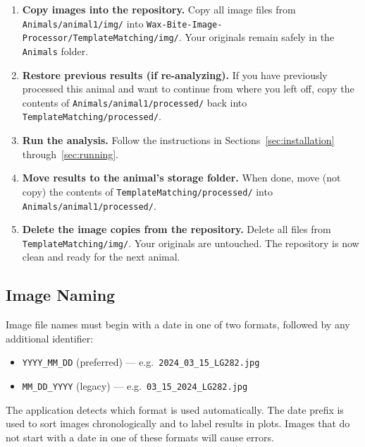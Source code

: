 \documentclass[11pt, letterpaper]{article}
\begin{document}
\begin{enumerate}[leftmargin=*, label=\textbf{\arabic*.}]
  \item \textbf{Copy images into the repository.}
    Copy all image files from \texttt{Animals/animal1/img/} into
    \texttt{Wax-Bite-Image-Processor/TemplateMatching/img/}.
    Your originals remain safely in the \texttt{Animals} folder.

  \item \textbf{Restore previous results (if re-analyzing).}
    If you have previously processed this animal and want to continue from where you left
    off, copy the contents of \texttt{Animals/animal1/processed/} back into
    \texttt{TemplateMatching/processed/}.

  \item \textbf{Run the analysis.}
    Follow the instructions in Sections~\ref{sec:installation} through~\ref{sec:running}.

  \item \textbf{Move results to the animal's storage folder.}
    When done, move (not copy) the contents of \texttt{TemplateMatching/processed/} into
    \texttt{Animals/animal1/processed/}.

  \item \textbf{Delete the image copies from the repository.}
    Delete all files from \texttt{TemplateMatching/img/}. Your originals are untouched.
    The repository is now clean and ready for the next animal.
\end{enumerate}

\subsection*{Image Naming}

Image file names must begin with a date in one of two formats, followed by any
additional identifier:

\begin{itemize}[leftmargin=*]
  \item \texttt{YYYY\_MM\_DD} (preferred) --- e.g.\ \texttt{2024\_03\_15\_LG282.jpg}
  \item \texttt{MM\_DD\_YYYY} (legacy) --- e.g.\ \texttt{03\_15\_2024\_LG282.jpg}
\end{itemize}

The application detects which format is used automatically. The date prefix is used
to sort images chronologically and to label results in plots. Images that do not
start with a date in one of these formats will cause errors.
\end{document}
